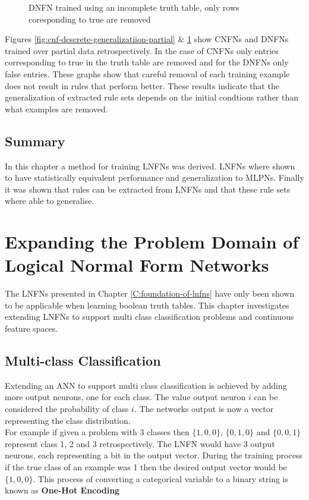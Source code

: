 \begin{figure}[H]
\begin{minipage}[b]{0.45\textwidth}
		\caption{DNFN trained using an incomplete truth table, only rows coresponding to true are removed}
		\label{fig:dnf-descrete-generalizatiion-partial}
	\end{minipage}
	\hfill
\end{figure}

Figures \ref{fig:cnf-descrete-generalizatiion-partial} \& \ref{fig:dnf-descrete-generalizatiion-partial} show CNFNs and DNFNs trained over partial data retrospectively. In the case of CNFNs only entries corresponding to true in the truth table are removed and for the DNFNs only false entries. These graphs show that careful removal of each training example does not result in rules that perform better. These results indicate that the generalization of extracted rule sets depends on the initial condtions rather than what examples are removed.

\section{Summary}
In this chapter a method for training LNFNs was derived. LNFNs where shown to have statistically equivalent performance and generalization to MLPNs. Finally it was shown that rules can be extracted from LNFNs and that these rule sets where able to generalise.

\chapter{Expanding the Problem Domain of Logical Normal Form Networks} \label{C:investigation-of-lnfns}
The LNFNs presented in Chapter \ref{C:foundation-of-lnfns} have only been shown to be applicable when learning boolean truth tables. This chapter investigates extending LNFNs to support multi class classification problems and continuous feature spaces.

\section{Multi-class Classification}
Extending an ANN to support multi class classification is achieved by adding more output neurons, one for each class. The value output neuron $i$ can be considered the probability of class $i$. The networks output is now a vector representing the class distribution. \\

For example if given a problem with 3 classes then $\{1,0,0\}$, $\{0,1,0\}$ and $\{0,0,1\}$ represent class 1, 2 and 3 retrospectively. The LNFN would have 3 output neurons, each representing a bit in the output vector. During the training process if the true class of an example was 1 then the desired output vector would be $\{1,0,0\}$. This process of converting a categorical variable to a binary string is known as \textbf{One-Hot Encoding}

